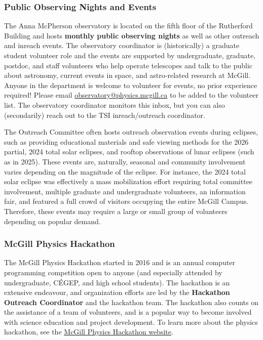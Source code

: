 \subsubsection{Public Observing Nights and Events} 
The Anna McPherson observatory is located on the fifth floor of the Rutherford Building and hosts \textbf{monthly public observing nights} as well as other outreach and inreach events. The observatory coordinator is (historically) a graduate student volunteer role and the events are supported by undergraduate, graduate, postdoc, and staff volunteers who help operate telescopes and talk to the public about astronomy, current events in space, and astro-related research at McGill. Anyone in the department is welcome to volunteer for events, no prior experience required! Please email \href{mailto:observatory@physics.mcgill.ca}{observatory@physics.mcgill.ca} to be added to the volunteer list. The observatory coordinator monitors this inbox, but you can also (secondarily) reach out to the TSI inreach/outreach coordinator.  

The Outreach Committee often hosts outreach observation events during eclipses, such as providing educational materials and safe viewing methods for the 2026 partial, 2024 total solar eclipses, and rooftop observations of lunar eclipses (such as in 2025). These events are, naturally, seasonal and community involvement varies depending on the magnitude of the eclipse. For instance, the 2024 total solar eclipse was effectively a mass mobilization effort requiring total committee involvement, multiple graduate and undergraduate volunteers, an information fair, and featured a full crowd of visitors occupying the entire McGill Campus. Therefore, these events may require a large or small group of volunteers depending on popular demand.

\subsubsection{McGill Physics Hackathon}
The McGill Physics Hackathon started in 2016 and is an annual computer programming competition open to anyone (and especially attended by undergraduate, CÉGEP, and high school students). The hackathon is an extensive endeavour, and organization efforts are led by the \textbf{Hackathon Outreach Coordinator} and the hackathon team. The hackathon also counts on the assistance of a team of volunteers, and is a popular way to become involved with science education and project development. To learn more about the physics hackathon, see the \href{https://www.hackathon.physics.mcgill.ca/}{McGill Physics Hackathon website}.

